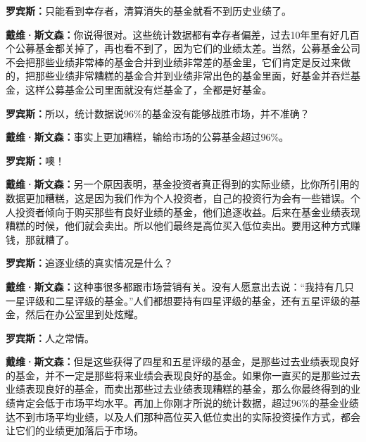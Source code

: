 \begin{BookQuote}
\textbf{罗宾斯：}只能看到幸存者，清算消失的基金就看不到历史业绩了。
\end{BookQuote}

\begin{BookQuote}
\textbf{戴维·斯文森：}你说得很对。这些统计数据都有幸存者偏差，过去10年里有好几百个公募基金都关掉了，再也看不到了，因为它们的业绩太差。当然，公募基金公司不会把那些业绩非常棒的基金合并到业绩非常差的基金里，它们肯定是反过来做的，把那些业绩非常糟糕的基金合并到业绩非常出色的基金里面，好基金并吞烂基金，这样公募基金公司里面就没有烂基金了，全都是好基金。
\end{BookQuote}

\begin{BookQuote}
\textbf{罗宾斯：}所以，统计数据说96\%的基金没有能够战胜市场，并不准确？
\end{BookQuote}

\begin{BookQuote}
\textbf{戴维·斯文森：}事实上更加糟糕，输给市场的公募基金超过96\%。
\end{BookQuote}

\begin{BookQuote}
\textbf{罗宾斯：}噢！
\end{BookQuote}

\begin{BookQuote}
\textbf{戴维·斯文森：}另一个原因表明，基金投资者真正得到的实际业绩，比你所引用的数据更加糟糕，这是因为我们作为个人投资者，自己的投资行为会有一些错误。个人投资者倾向于购买那些有良好业绩的基金，他们追逐收益。后来在基金业绩表现糟糕的时候，他们就会卖出。所以他们最终是高位买入低位卖出。要用这种方式赚钱，那就糟了。
\end{BookQuote}

\begin{BookQuote}
\textbf{罗宾斯：}追逐业绩的真实情况是什么？
\end{BookQuote}

\begin{BookQuote}
\textbf{戴维·斯文森：}这种事很多都跟市场营销有关。没有人愿意出去说：“我持有几只一星评级和二星评级的基金。”人们都想要持有四星评级的基金，还有五星评级的基金，然后在办公室里到处炫耀。
\end{BookQuote}

\begin{BookQuote}
\textbf{罗宾斯：}人之常情。
\end{BookQuote}

\begin{BookQuote}
\textbf{戴维·斯文森：}但是这些获得了四星和五星评级的基金，是那些过去业绩表现良好的基金，并不一定是那些将来业绩会表现良好的基金。如果你一直买的是那些过去业绩表现良好的基金，而卖出那些过去业绩表现糟糕的基金，那么你最终得到的业绩肯定会低于市场平均水平。再加上你刚才所说的统计数据，超过96\%的基金业绩达不到市场平均业绩，以及人们那种高位买入低位卖出的实际投资操作方式，都会让它们的业绩更加落后于市场。
\end{BookQuote}

